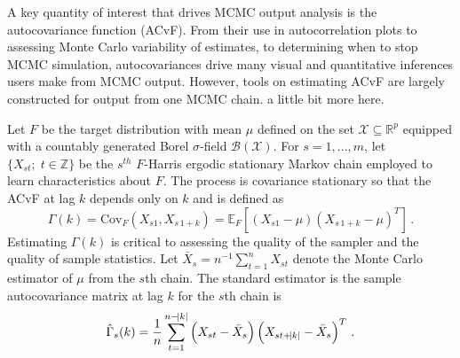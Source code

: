 \documentclass[11pt]{article}
\newcommand{\Cov}{\text{Cov}}
\newcommand{\X}{\mathcal{X}}
\theoremstyle{remark}
\begin{document}
A key quantity of interest that drives MCMC output analysis is the autocovariance function (ACvF). From their use in autocorrelation plots to assessing Monte Carlo variability of estimates, to determining when to stop MCMC simulation, autocovariances drive many visual and quantitative inferences users make from MCMC output. However, tools on estimating ACvF are largely constructed for output from one MCMC chain. {\color{blue} a little bit more here}.



Let $F$ be the target distribution with mean $\mu$ defined on the set $\X \subseteq \mathbb{R}^p$ equipped with a countably generated Borel $\sigma$-field $\mathcal{B}(\X)$. For $s = 1, \dots, m$, let $\{X_{st}; \; t \in \mathbb{Z}\}$ be the $s^{th}$ $F$-Harris ergodic stationary Markov chain \citep[see][for definitions]{meyn:twee:2009} employed to learn characteristics about $F$.
The process is covariance stationary so that
the ACvF at lag $k$ depends only on $k$ and is defined as 
%
\[
    \Gamma(k) = \Cov_F(X_{s1}, X_{s\,1+k})= \mathbb{E}_F \left[(X_{s1} - \mu)(X_{s\,1+k} - \mu)^T \right]\,.
\]
Estimating $\Gamma(k)$ is critical to assessing the quality of the sampler and the quality of sample statistics. Let $\bar{X}_s = n^{-1} \sum_{t=1}^{n} X_{st}$ denote the Monte Carlo estimator of $\mu$ from the $s$th chain. The standard estimator is the sample autocovariance matrix at lag $k$ for the $s$th chain is
%
\begin{equation} \label{eq:empirical_acf}
    \hat{\Gamma}_s(k) = \dfrac{1}{n}\sum_{t=1}^{n-\abs{k}} \left(X_{st} - \bar{X}_s \right) \left(X_{s t+\abs{k}} - \bar{X}_s \right)^T\,.
\end{equation}
%
\end{document}

